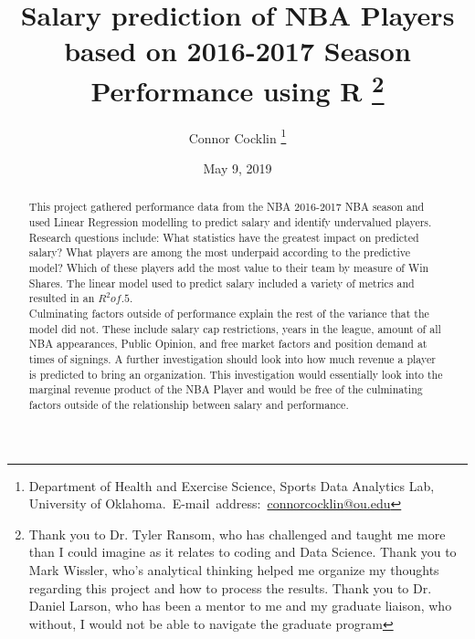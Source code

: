\documentclass[12pt,english]{article}
\begin{document}
\begin{singlespace}
\title{Salary prediction of NBA Players based on 2016-2017 Season Performance using R \thanks{Thank you to Dr. Tyler Ransom, who has challenged and taught me more than I could imagine as it relates to coding and Data Science. Thank you to Mark Wissler, who's analytical thinking helped me organize my thoughts regarding this project and how to process the results. Thank you to Dr. Daniel Larson, who has been a mentor to me and my graduate liaison, who without, I would not be able to navigate the graduate program}}
\end{singlespace}
\author{Connor Cocklin \thanks{Department of Health and Exercise Science, Sports Data Analytics Lab, University of Oklahoma.\
E-mail~address:~\href{mailto:connorcocklin@ou.edu}{connorcocklin@ou.edu}}}

\date{May 9, 2019}

\maketitle


\begin{abstract}
 \begin{doublespace}
This project gathered performance data from the NBA 2016-2017 NBA season and used Linear Regression modelling to predict salary and identify undervalued players. Research questions include: What statistics have the greatest impact on predicted salary? What players are among the most underpaid according to the predictive model? Which of these players add the most value to their team by measure of Win Shares. The linear model used to predict salary included a variety of metrics and resulted in an $R^2 of .5.$ \\
\indent Culminating factors outside of performance explain the rest of the variance that the model did not. These include salary cap restrictions, years in the league, amount of all NBA appearances, Public Opinion, and free market factors and position demand at times of signings. A further investigation should look into how much revenue a player is predicted to bring an organization. This investigation would essentially look into the marginal revenue product of the NBA Player and would be free of the culminating factors outside of the relationship between salary and performance.
\end{doublespace}   
\end{abstract}

\vfill{}
\end{document}
